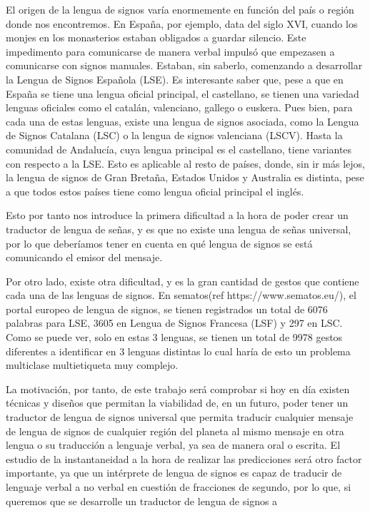 \documentclass{article} %
\begin{document}
\noindent El origen de la lengua de signos var\'{i}a enormemente en funci\'{o}n del pa\'{i}s o regi\'{o}n donde nos encontremos. En Espa\~{n}a, por ejemplo, data del siglo XVI, cuando los monjes en los monasterios estaban obligados a guardar silencio. Este impedimento para comunicarse de manera verbal impuls\'{o} que empezasen a comunicarse con signos manuales. Estaban, sin saberlo, comenzando a desarrollar la Lengua de Signos Espa\~{n}ola (LSE). Es interesante saber que, pese a que en Espa\~{n}a se tiene una lengua oficial principal, el castellano, se tienen una variedad lenguas oficiales como el catal\'{a}n, valenciano, gallego o euskera. Pues bien, para cada una de estas lenguas, existe una lengua de signos asociada, como la Lengua de Signos Catalana (LSC) o la lengua de signos valenciana (LSCV). Hasta la comunidad de Andaluc\'{i}a, cuya lengua principal es el castellano, tiene variantes con respecto a la LSE. Esto es aplicable al resto de pa\'{i}ses, donde, sin ir m\'{a}s lejos, la lengua de signos de Gran Breta\~{n}a, Estados Unidos y Australia es distinta, pese a que todos estos pa\'{i}ses tiene como lengua oficial principal el ingl\'{e}s.

\noindent Esto por tanto nos introduce la primera dificultad a la hora de poder crear un traductor de lengua de se\~{n}as, y es que no existe una lengua de se\~{n}as universal, por lo que deber\'{i}amos tener en cuenta en qu\'{e} lengua de signos se est\'{a} comunicando el emisor del mensaje.

\noindent Por otro lado, existe otra dificultad, y es la gran cantidad de gestos que contiene cada una de las lenguas de signos. En sematos(ref https://www.sematos.eu/), el portal europeo de lengua de signos, se tienen registrados un total de 6076 palabras para LSE, 3605 en Lengua de Signos Francesa (LSF) y 297 en LSC. Como se puede ver, solo en estas 3 lenguas, se tienen un total de 9978 gestos diferentes a identificar en 3 lenguas distintas lo cual har\'{i}a de esto un problema multiclase multietiqueta muy complejo.

\noindent La motivaci\'{o}n, por tanto, de este trabajo ser\'{a} comprobar si hoy en d\'{i}a existen t\'{e}cnicas y dise\~{n}os que permitan la viabilidad de, en un futuro, poder tener un traductor de lengua de signos universal que permita traducir cualquier mensaje de lengua de signos de cualquier regi\'{o}n del planeta al mismo mensaje en otra lengua o su traducci\'{o}n a lenguaje verbal, ya sea de manera oral o escrita. El estudio de la instantaneidad a la hora de realizar las predicciones ser\'{a} otro factor importante, ya que un int\'{e}rprete de lengua de signos es capaz de traducir de lenguaje verbal a no verbal en cuesti\'{o}n de fracciones de segundo, por lo que, si queremos que se desarrolle un traductor de lengua de signos a 
\end{document}
